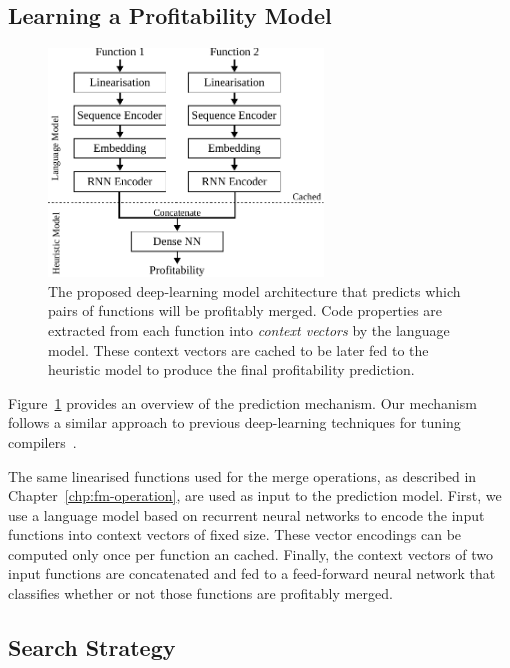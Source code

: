 \subsection{Learning a Profitability Model} \label{sec:deepprofit-model}

\begin{figure}[h]
  \centering
  \includegraphics[width=0.65\textwidth]{src/deeplearning/figs/deeplearning-architecture.pdf}
  \caption{
      The proposed deep-learning model architecture that predicts which pairs of functions will be profitably merged. Code properties are extracted from each function into \textit{context vectors} by the language model.
      These context vectors are cached to be later fed to the heuristic model to produce the final profitability prediction.}
  \label{fig:heuristic-model-architecture}
\end{figure}

Figure~\ref{fig:heuristic-model-architecture} provides an overview of the prediction mechanism.
Our mechanism follows a similar approach to previous deep-learning techniques for tuning compilers~\cite{cummins17, mendis19}.

The same linearised functions used for the merge operations, as described in Chapter~\ref{chp:fm-operation}, are used as input to the prediction model.
First, we use a language model based on recurrent neural networks to encode the input functions into context vectors of fixed size.
These vector encodings can be computed only once per function an cached.
Finally, the context vectors of two input functions are concatenated and fed to a feed-forward neural network that classifies whether or not those functions are profitably merged.

\subsection{Search Strategy}

